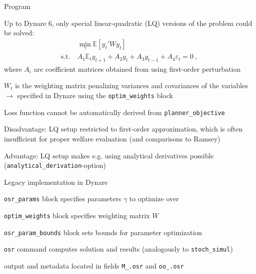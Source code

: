 \documentclass[handout,usepdftitle=false,xcolor=dvipsnames,aspectratio=169]{beamer}
\begin{document}
\begin{frame}{Program}
  \begin{witemize}
    \item Up to Dynare 6, only special linear-quadratic (LQ) versions of the problem could be solved:
          \begin{align}
                         & \min_\gamma \mathbb{E} \left[ y_t'W y_t \right]                        \\
            \text{s.t.}~ & A_1 \mathbb{E}_t y_{t+1} + A_2 y_t + A_3 y_{t-1} + A_4 \varepsilon_t = 0 \: ,
          \end{align}
          where $A_i$ are coefficient matrices obtained from using first-order perturbation
    \item $W_t$ is the weighting matrix penalizing variances and covariances of the variables\\
          $\rightarrow$ specified in Dynare using the \texttt{optim\_weights} block\\
    \item Loss function cannot be automatically derived from \texttt{planner\_objective}
    \item Disadvantage: LQ setup restricted to first-order approximation, which is often insufficient for proper welfare evaluation (and comparisons to Ramsey)
    \item Advantage: LQ setup makes e.g. using analytical derivatives possible\\ (\texttt{analytical\_derivation}-option)
  \end{witemize}
\end{frame}


\begin{frame}{Legacy implementation in Dynare}
  \begin{witemize}
    \item \texttt{osr\_params} block specifies parameters $\gamma$ to optimize over
    \item \texttt{optim\_weights} block specifies weighting matrix $W$
    \item \texttt{osr\_param\_bounds} block sets bounds for parameter optimization
    \item  \texttt{osr} command computes solution and results (analogously to \texttt{stoch\_simul})
    \item  output and metadata located in fields \texttt{M\_.osr} and \texttt{oo\_.osr}
  \end{witemize}
\end{frame}
\end{document}
